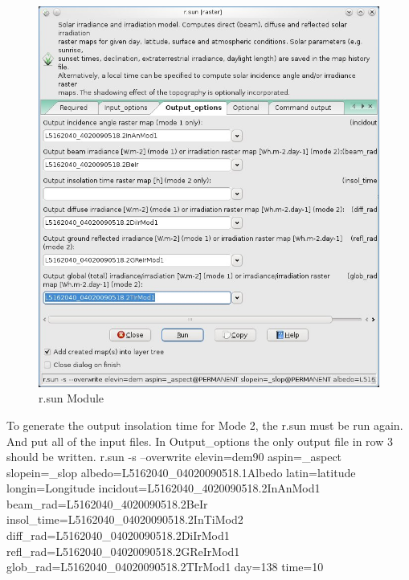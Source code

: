 \begin{figure}[htbp]
   \centering
   \includegraphics[scale=0.4]{gipe025.png}
   \caption{r.sun Module}
   \label{fig:gipe025}
\end{figure}

To generate the output insolation time for Mode 2, the r.sun must be run again. And put all of the input files. In Output\_options the only output file in row 3 should be written.\newline\linebreak
r.sun -s --overwrite elevin=dem90\newline
aspin=\_aspect slopein=\_slop\newline
albedo=L5162040\_04020090518.1Albedo\newline
latin=latitude longin=Longitude\newline
incidout=L5162040\_4020090518.2InAnMod1\newline
beam\_rad=L5162040\_4020090518.2BeIr\newline
insol\_time=L5162040\_04020090518.2InTiMod2\newline
diff\_rad=L5162040\_04020090518.2DiIrMod1\newline
refl\_rad=L5162040\_04020090518.2GReIrMod1\newline
glob\_rad=L5162040\_04020090518.2TIrMod1\newline
day=138 time=10
